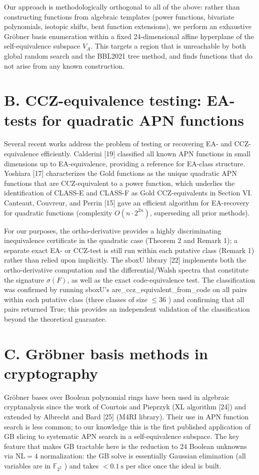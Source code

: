 \documentclass[10pt]{article}
\begin{document}
Our approach is methodologically orthogonal to all of the above: rather than constructing functions from algebraic templates (power functions, bivariate polynomials, isotopic shifts, bent function extensions), we perform an exhaustive Gröbner basis enumeration within a fixed 24-dimensional affine hyperplane of the self-equivalence subspace $V_{A}$. This targets a region that is unreachable by both global random search and the BBL2021 tree method, and finds functions that do not arise from any known construction.

\section*{B. CCZ-equivalence testing: EA-tests for quadratic APN functions}
Several recent works address the problem of testing or recovering EA- and CCZ-equivalence efficiently. Calderini [19] classified all known APN functions in small dimensions up to EA-equivalence, providing a reference for EA-class structure. Yoshiara [17] characterizes the Gold functions as the unique quadratic APN functions that are CCZ-equivalent to a power function, which underlies the identification of CLASS-E and CLASS-F as Gold CCZ-equivalents in Section VI. Canteaut, Couvreur, and Perrin [15] gave an efficient algorithm for EA-recovery for quadratic functions (complexity $O\left(n \cdot 2^{2 n}\right)$, superseding all prior methods).

For our purposes, the ortho-derivative provides a highly discriminating inequivalence certificate in the quadratic case (Theorem 2 and Remark 1); a separate exact EA- or CCZ-test is still run within each putative class (Remark 1) rather than relied upon implicitly. The sboxU library [22] implements both the ortho-derivative computation and the differential/Walsh spectra that constitute the signature $\sigma(F)$, as well as the exact code-equivalence test. The classification was confirmed by running sboxU's are\_ccz\_equivalent\_from\_code on all pairs within each putative class (three classes of size $\leq 36$ ) and confirming that all pairs returned True; this provides an independent validation of the classification beyond the theoretical guarantee.

\section*{C. Gröbner basis methods in cryptography}
Gröbner bases over Boolean polynomial rings have been used in algebraic cryptanalysis since the work of Courtois and Pieprzyk (XL algorithm [24]) and extended by Albrecht and Bard [25] (M4RI library). Their use in APN function search is less common; to our knowledge this is the first published application of GB slicing to systematic APN search in a self-equivalence subspace. The key feature that makes GB tractable here is the reduction to 24 Boolean unknowns via $\mathrm{NL}=4$ normalization: the GB solve is essentially Gaussian elimination (all variables are in $\mathbb{F}_{2^{2}}$ ) and takes $<0.1 \mathrm{~s}$ per slice once the ideal is built.
\end{document}
